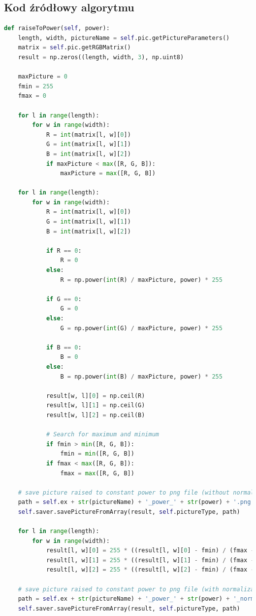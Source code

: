 \documentclass[a4paper,12pt, titlepage]{report}
\begin{document}
\subsection*{Kod źródłowy algorytmu}
\begin{lstlisting}[language=Python]
def raiseToPower(self, power):
    length, width, pictureName = self.pic.getPictureParameters()
    matrix = self.pic.getRGBMatrix()
    result = np.zeros((length, width, 3), np.uint8)

    maxPicture = 0
    fmin = 255
    fmax = 0

    for l in range(length):
        for w in range(width):
            R = int(matrix[l, w][0])
            G = int(matrix[l, w][1])
            B = int(matrix[l, w][2])
            if maxPicture < max([R, G, B]):
                maxPicture = max([R, G, B])

    for l in range(length):
        for w in range(width):
            R = int(matrix[l, w][0])
            G = int(matrix[l, w][1])
            B = int(matrix[l, w][2])

            if R == 0:
                R = 0
            else:
                R = np.power(int(R) / maxPicture, power) * 255

            if G == 0:
                G = 0
            else:
                G = np.power(int(G) / maxPicture, power) * 255

            if B == 0:
                B = 0
            else:
                B = np.power(int(B) / maxPicture, power) * 255

            result[w, l][0] = np.ceil(R)
            result[w, l][1] = np.ceil(G)
            result[w, l][2] = np.ceil(B)

            # Search for maximum and minimum
            if fmin > min([R, G, B]):
                fmin = min([R, G, B])
            if fmax < max([R, G, B]):
                fmax = max([R, G, B])

    # save picture raised to constant power to png file (without normalization)
    path = self.ex + str(pictureName) + '_power_' + str(power) + '.png'
    self.saver.savePictureFromArray(result, self.pictureType, path)

    for l in range(length):
        for w in range(width):
            result[l, w][0] = 255 * ((result[l, w][0] - fmin) / (fmax - fmin))
            result[l, w][1] = 255 * ((result[l, w][1] - fmin) / (fmax - fmin))
            result[l, w][2] = 255 * ((result[l, w][2] - fmin) / (fmax - fmin))

    # save picture raised to constant power to png file (with normalization)
    path = self.ex + str(pictureName) + '_power_' + str(power) + '_normalized.png'
    self.saver.savePictureFromArray(result, self.pictureType, path)
\end{lstlisting}
\end{document}
